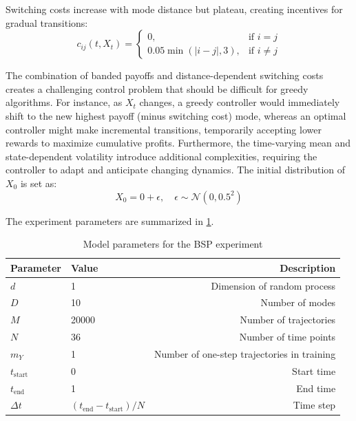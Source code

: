 \documentclass[11pt,reqno,a4paper]{amsart}
\theoremstyle{definition}
\numberwithin{equation}{section}
\DeclareMathOperator{\1}{\mathbbm{1}}
\begin{document}
Switching costs increase with mode distance but plateau, creating incentives for gradual transitions:
\begin{equation}
  c_{ij}(t,X_t) =
  \begin{cases}
    0,                   & \text{if } i = j    \\
    0.05 \min(|i-j|, 3), & \text{if } i \neq j
  \end{cases}
\end{equation}

The combination of banded payoffs and distance-dependent switching costs creates a challenging control problem that should be difficult for greedy algorithms. For instance, as $X_t$ changes, a greedy controller would immediately shift to the new highest payoff (minus switching cost) mode, whereas an optimal controller might make incremental transitions, temporarily accepting lower rewards to maximize cumulative profits. Furthermore, the time-varying mean and state-dependent volatility introduce additional complexities, requiring the controller to adapt and anticipate changing dynamics.
The initial distribution of $X_0$ is set as:
\begin{equation}\label{eq:stapel:x0}
  X_0 = 0 + \epsilon, \quad \epsilon \sim \mathcal{N}(0, 0.5^2)
\end{equation}


The experiment parameters are summarized in \cref{tab:bsp_params}.
\begin{table}[!hbtp]
  \centering
  \caption{Model parameters for the BSP experiment}
  \label{tab:bsp_params}
  \begin{tabular}{@{}llr@{}}
    \toprule
    Parameter        & Value                               & Description                                 \\
    \midrule
    $d$              & 1                                   & Dimension of random process                 \\
    $D$              & 10                                  & Number of modes                             \\
    $M$              & 20000                               & Number of trajectories                      \\
    $N$              & 36                                  & Number of time points                       \\
    $m_Y$            & 1                                   & Number of one-step trajectories in training \\
    $t_\text{start}$ & 0                                   & Start time                                  \\
    $t_\text{end}$   & 1                                   & End time                                    \\
    $\Delta t$       & $(t_\text{end} - t_\text{start})/N$ & Time step                                   \\
    \bottomrule
  \end{tabular}
\end{table}
\end{document}

